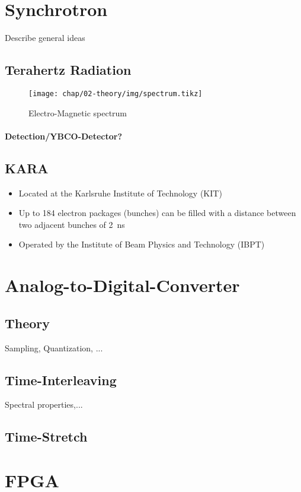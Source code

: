 \section{Synchrotron}
Describe general ideas

\subsection{Terahertz Radiation}
\begin{figure}[H]
	\centering
	\texttt{[image: chap/02-theory/img/spectrum.tikz]}
	\caption{Electro-Magnetic spectrum}
	\label{fig:spectrum}
\end{figure}


\paragraph{Detection/YBCO-Detector?}

\newpage
\subsection{KARA}
\begin{itemize}
	\item Located at the Karlsruhe Institute of Technology (KIT)
	\item Up to 184 electron packages (bunches) can be filled with a distance between two adjacent bunches of \SI{2}{\nano \second}
	\item Operated by the Institute of Beam Physics and Technology (IBPT)
\end{itemize}

\newpage 
\section{Analog-to-Digital-Converter}
\subsection{Theory}
Sampling, Quantization, ...
\subsection{Time-Interleaving}
Spectral properties,...
\subsection{Time-Stretch}

\newpage
\section{FPGA}
